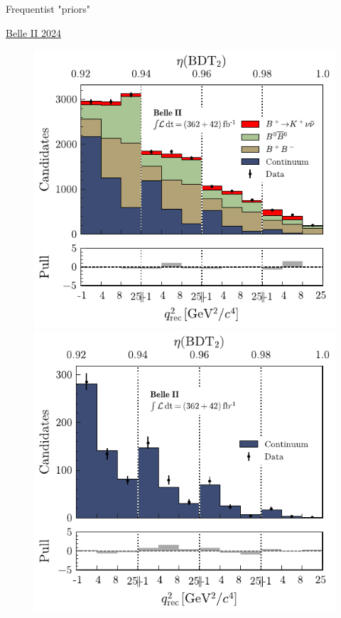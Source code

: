 \documentclass[
aspectratio=169,
14pt,
professionalfonts
]{beamer}
\begin{document}
\begin{frame}{Frequentist "priors"}
\begin{minipage}{0.7\textwidth}
        \flushright \small
        \href{https://arxiv.org/pdf/2311.14647}{Belle II 2024}
    \end{minipage}
    \begin{minipage}{0.29\textwidth}
        \begin{figure}
            \centering
            \includegraphics[width=\textwidth]{../plots/knunu-signal.pdf}
            \includegraphics[width=\textwidth]{../plots/knunu-offres.pdf}
        \end{figure}
    \end{minipage}
    \end{frame}
    
\end{document}
